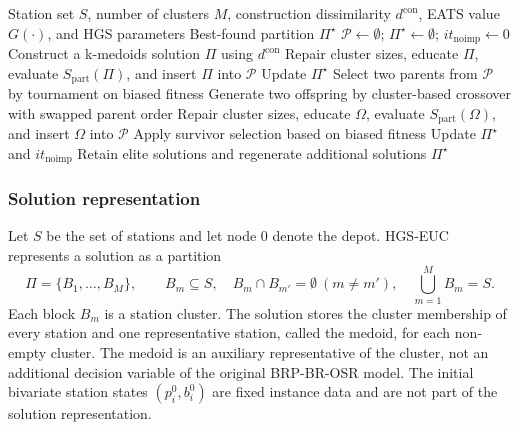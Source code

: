 \begin{algorithm}[t]
\caption{HGS-EUC partition search}
\label{alg:hgs-euc}
\footnotesize
\begin{algorithmic}[1]
\Require Station set $S$, number of clusters $M$, construction dissimilarity
$d^{\mathrm{con}}$, EATS value $G(\cdot)$, and HGS parameters
\Ensure Best-found partition $\Pi^\star$
\State $\mathcal P\gets\emptyset$; $\Pi^\star\gets\emptyset$;
$it_{\mathrm{noimp}}\gets 0$
    \State Construct a k-medoids solution $\Pi$ using $d^{\mathrm{con}}$
    \State Repair cluster sizes, educate $\Pi$, evaluate
    $S_{\mathrm{part}}(\Pi)$, and insert $\Pi$ into $\mathcal P$
    \State Update $\Pi^\star$
\EndWhile
{}
    \State Select two parents from $\mathcal P$ by tournament on biased fitness
    \State Generate two offspring by cluster-based crossover with swapped parent order
        \State Repair cluster sizes, educate $\Omega$, evaluate
        $S_{\mathrm{part}}(\Omega)$, and insert $\Omega$ into $\mathcal P$
    \EndFor
        \State Apply survivor selection based on biased fitness
    \EndIf
    \State Update $\Pi^\star$ and $it_{\mathrm{noimp}}$
        \State Retain elite solutions and regenerate additional solutions
    \EndIf
\EndWhile
\State \Return $\Pi^\star$
\end{algorithmic}
\end{algorithm}

\subsubsection{Solution representation}\label{sec:hgs-euc-representation}

Let $S$ be the set of stations and let node $0$ denote the depot. HGS-EUC
represents a solution as a partition
\begin{equation}
\Pi=\{B_1,\ldots,B_M\},
\qquad
B_m\subseteq S,
\quad
B_m\cap B_{m'}=\emptyset\ (m\ne m'),
\quad
\bigcup_{m=1}^{M}B_m=S.
\label{eq:cfrs-partition}
\end{equation}
Each block $B_m$ is a station cluster. The solution stores the cluster
membership of every station and one representative station, called the medoid,
for each non-empty cluster. The medoid is an auxiliary representative of the
cluster, not an additional decision variable of the original BRP-BR-OSR model.
The initial bivariate station states $(p_i^0,b_i^0)$ are fixed instance data and
are not part of the solution representation.

